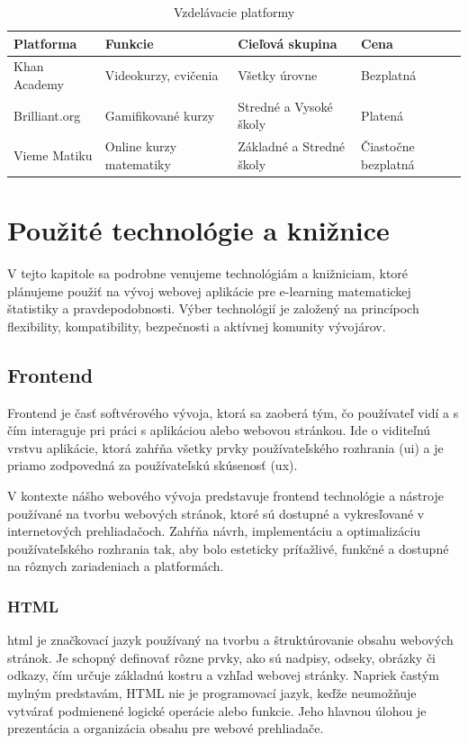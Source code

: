\begin{table}[htbp]
\caption{Vzdelávacie platformy}
\label{vzdelavaciePlatformy}
\begin{tabularx}{\textwidth}{|X|X|X|X|}
\hline
\textbf{Platforma} & \textbf{Funkcie} & \textbf{Cieľová skupina} & \textbf{Cena} \\ \hline
Khan Academy & Videokurzy, cvičenia & Všetky úrovne & Bezplatná \\ \hline
Brilliant.org & Gamifikované kurzy & Stredné a Vysoké školy & Platená \\ \hline
Vieme Matiku & Online kurzy matematiky & Základné a Stredné školy & Čiastočne bezplatná \\ \hline
\end{tabularx}
\end{table}

\section{Použité technológie a knižnice}
V tejto kapitole sa podrobne venujeme technológiám a knižniciam, ktoré plánujeme
použiť na vývoj webovej aplikácie pre e-learning matematickej štatistiky a
pravdepodobnosti. Výber technológií je založený na princípoch flexibility,
kompatibility, bezpečnosti a aktívnej komunity vývojárov.


\subsection{Frontend}
Frontend je časť softvérového vývoja, ktorá sa zaoberá tým, čo používateľ vidí a s čím interaguje pri práci s aplikáciou alebo webovou stránkou. 
Ide o viditeľnú vrstvu aplikácie, ktorá zahŕňa všetky prvky používateľského rozhrania (\acrshort{ui}) a je priamo zodpovedná za používateľskú skúsenosť (\acrshort{ux}).

V kontexte nášho webového vývoja predstavuje frontend technológie a nástroje používané na tvorbu webových stránok, ktoré sú dostupné a vykresľované v internetových prehliadačoch. 
Zahŕňa návrh, implementáciu a optimalizáciu používateľského rozhrania tak, aby bolo esteticky príťažlivé, funkčné a dostupné na rôznych zariadeniach a platformách.
\subsubsection*{HTML}
\acrfull{html} je značkovací jazyk používaný na tvorbu a štruktúrovanie obsahu webových stránok.
Je schopný definovať rôzne prvky, ako sú nadpisy, odseky, obrázky či odkazy, čím určuje základnú kostru a vzhľad webovej stránky.
Napriek častým mylným predstavám, HTML nie je programovací jazyk, keďže neumožňuje vytvárať podmienené logické operácie alebo funkcie.
Jeho hlavnou úlohou je prezentácia a organizácia obsahu pre webové prehliadače. 
\cite{HTML}

